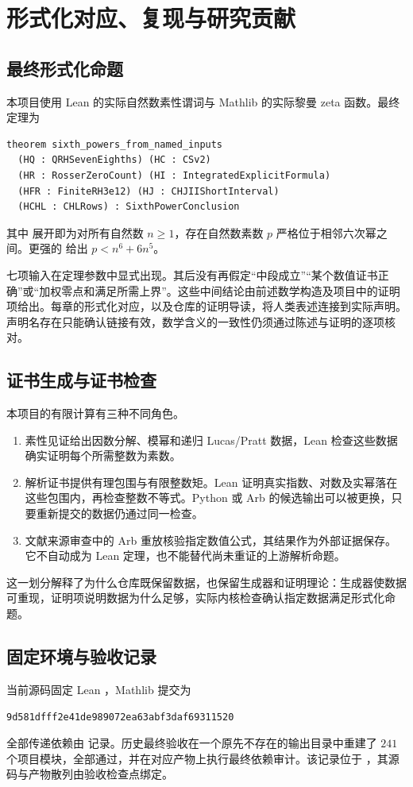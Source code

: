 \section{形式化对应、复现与研究贡献}\label{sec:formalization}

\subsection{最终形式化命题}
本项目使用 Lean 的实际自然数素性谓词与 Mathlib 的实际黎曼 zeta 函数。最终定理为
\begin{Verbatim}[fontsize=\small,breaklines=true]
theorem sixth_powers_from_named_inputs
  (HQ : QRHSevenEighths) (HC : CSv2)
  (HR : RosserZeroCount) (HI : IntegratedExplicitFormula)
  (HFR : FiniteRH3e12) (HJ : CHJIIShortInterval)
  (HCHL : CHLRows) : SixthPowerConclusion
\end{Verbatim}
其中  展开即为对所有自然数 $n\ge1$，存在自然数素数 $p$ 严格位于相邻六次幂之间。更强的  给出 $p<n^6+6n^5$。

七项输入在定理参数中显式出现。其后没有再假定“中段成立”“某个数值证书正确”或“加权零点和满足所需上界”。这些中间结论由前述数学构造及项目中的证明项给出。每章的形式化对应，以及仓库的证明导读，将人类表述连接到实际声明。声明名存在只能确认链接有效，数学含义的一致性仍须通过陈述与证明的逐项核对。

\subsection{证书生成与证书检查}
本项目的有限计算有三种不同角色。
\begin{enumerate}
\item 素性见证给出因数分解、模幂和递归 Lucas/Pratt 数据，Lean 检查这些数据确实证明每个所需整数为素数。
\item 解析证书提供有理包围与有限整数矩。Lean 证明真实指数、对数及实幂落在这些包围内，再检查整数不等式。Python 或 Arb 的候选输出可以被更换，只要重新提交的数据仍通过同一检查。
\item 文献来源审查中的 Arb\cite{Arb} 重放核验指定数值公式，其结果作为外部证据保存。它不自动成为 Lean 定理，也不能替代尚未重证的上游解析命题。
\end{enumerate}
这一划分解释了为什么仓库既保留数据，也保留生成器和证明理论：生成器使数据可重现，证明项说明数据为什么足够，实际内核检查确认指定数据满足形式化命题。

\subsection{固定环境与验收记录}
当前源码固定 Lean \cite{LeanPinned}，Mathlib\cite{MathlibPinned} 提交为
\begin{center}\small\nolinkurl{9d581dfff2e41de989072ea63abf3daf69311520}\end{center}
全部传递依赖由  记录。历史最终验收在一个原先不存在的输出目录中重建了 $241$ 个项目模块，全部通过，并在对应产物上执行最终依赖审计。该记录位于 ，其源码与产物散列由验收检查点绑定。


